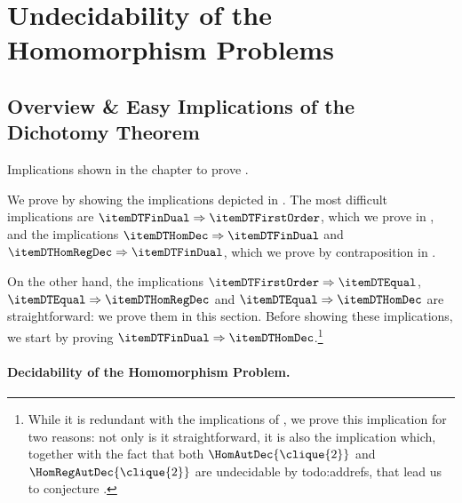 \section{\AP\label{sec:dichotomy-undecidability}%
	Undecidability of the Homomorphism Problems}

\subsection{\AP\label{sec:dichotomy-overview}%
Overview \& Easy Implications of the Dichotomy Theorem}

\DichotomyThmDichotomyAutomatic

\begin{marginfigure}
	\centering
	\begin{tikzpicture}
		
	\end{tikzpicture}
	\caption{\AP\label{fig:dichotomy-overview}Implications shown in the chapter to prove
	.}
\end{marginfigure}
We prove  by showing the
implications depicted in .
The most difficult implications are $\itemDTFinDual \Rightarrow \itemDTFirstOrder$,
which we prove in , and the implications
$\itemDTHomDec \Rightarrow \itemDTFinDual$ and $\itemDTHomRegDec \Rightarrow \itemDTFinDual$,
which we prove by contraposition in .

On the other hand, the implications $\itemDTFirstOrder \Rightarrow \itemDTEqual$,
$\itemDTEqual \Rightarrow \itemDTHomRegDec$ and $\itemDTEqual \Rightarrow \itemDTHomDec$ are straightforward: we prove them in this section. 
Before showing these implications, we start by proving $\itemDTFinDual \Rightarrow \itemDTHomDec$.\footnote{While it is redundant with the implications of , 
we prove this implication for two reasons: not only is it straightforward, it is also
the implication which, together with the fact that both $\HomAutDec{\clique{2}}$
and $\HomRegAutDec{\clique{2}}$ are undecidable by todo:addrefs, that lead us to conjecture
.}

\paragraph*{Decidability of the Homomorphism Problem.}

